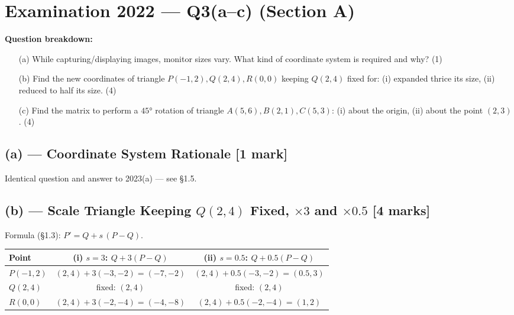 \documentclass[12pt, a4paper]{article}
\newenvironment{solutionbox}{\begin{mdframed}[style=solutionframe]}{\end{mdframed}}
\begin{document}
\section{Examination 2022 --- Q3(a--c) (Section A)}
\begin{solutionbox}
\textbf{Question breakdown:}
\begin{enumerate}[noitemsep]
  \item[(a)] While capturing/displaying images, monitor sizes vary. What kind of coordinate system is required and why? (1)
  \item[(b)] Find the new coordinates of triangle $P(-1,2), Q(2,4), R(0,0)$ keeping $Q(2,4)$ fixed for: (i) expanded thrice its size, (ii) reduced to half its size. (4)
  \item[(c)] Find the matrix to perform a $45°$ rotation of triangle $A(5,6), B(2,1), C(5,3)$: (i) about the origin, (ii) about the point $(2,3)$. (4)
\end{enumerate}
\end{solutionbox}

\subsection*{(a) --- Coordinate System Rationale [1 mark]}
Identical question and answer to 2023(a) --- see \S1.5.

\subsection*{(b) --- Scale Triangle Keeping $Q(2,4)$ Fixed, $\times3$ and $\times0.5$ [4 marks]}
Formula (\S1.3): $P'=Q+s\,(P-Q)$.
\begin{solutionbox}
\begin{center}
\begin{tabular}{lcc}
\toprule
Point & (i) $s=3$: $Q+3(P-Q)$ & (ii) $s=0.5$: $Q+0.5(P-Q)$ \\
\midrule
$P(-1,2)$ & $(2,4)+3(-3,-2)=(-7,-2)$ & $(2,4)+0.5(-3,-2)=(0.5,3)$ \\
$Q(2,4)$ & fixed: $(2,4)$ & fixed: $(2,4)$ \\
$R(0,0)$ & $(2,4)+3(-2,-4)=(-4,-8)$ & $(2,4)+0.5(-2,-4)=(1,2)$ \\
\bottomrule
\end{tabular}
\end{center}
\end{solutionbox}
\end{document}
